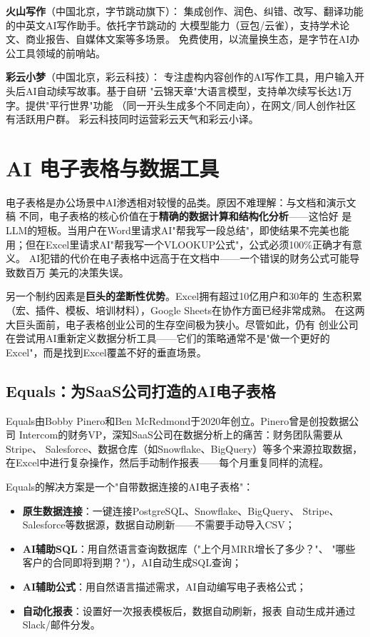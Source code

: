 \textbf{火山写作}（中国北京，字节跳动旗下）：
集成创作、润色、纠错、改写、翻译功能的中英文AI写作助手。依托字节跳动的
大模型能力（豆包/云雀），支持学术论文、商业报告、自媒体文案等多场景。
免费使用，以流量换生态，是字节在AI办公工具领域的前哨站。

\textbf{彩云小梦}（中国北京，彩云科技）：
专注虚构内容创作的AI写作工具，用户输入开头后AI自动续写故事。基于自研
"云锦天章"大语言模型，支持单次续写长达1万字。提供"平行世界"功能
（同一开头生成多个不同走向），在网文/同人创作社区有活跃用户群。
彩云科技同时运营彩云天气和彩云小译。



\section{AI 电子表格与数据工具}
\label{sec:cprod-spreadsheets}

电子表格是办公场景中AI渗透相对较慢的品类。原因不难理解：与文档和演示文稿
不同，电子表格的核心价值在于\textbf{精确的数据计算和结构化分析}——这恰好
是LLM的短板。当用户在Word里请求AI"帮我写一段总结"，即使结果不完美也能
用；但在Excel里请求AI"帮我写一个VLOOKUP公式"，公式必须100\%正确才有意义。
AI犯错的代价在电子表格中远高于在文档中——一个错误的财务公式可能导致数百万
美元的决策失误。

另一个制约因素是\textbf{巨头的垄断性优势}。Excel拥有超过10亿用户和30年的
生态积累（宏、插件、模板、培训材料），Google Sheets在协作方面已经非常成熟。
在这两大巨头面前，电子表格创业公司的生存空间极为狭小。尽管如此，仍有
创业公司在尝试用AI重新定义数据分析工具——它们的策略通常不是"做一个更好的
Excel"，而是找到Excel覆盖不好的垂直场景。

\subsection{Equals：为SaaS公司打造的AI电子表格}
\label{subsec:equals}

Equals由Bobby Pinero和Ben McRedmond于2020年创立。Pinero曾是创投数据公司
Intercom的财务VP，深知SaaS公司在数据分析上的痛苦：财务团队需要从Stripe、
Salesforce、数据仓库（如Snowflake、BigQuery）等多个来源拉取数据，
在Excel中进行复杂操作，然后手动制作报表——每个月重复同样的流程。

Equals的解决方案是一个"自带数据连接的AI电子表格"：

\begin{itemize}
  \item \textbf{原生数据连接}：一键连接PostgreSQL、Snowflake、BigQuery、
    Stripe、Salesforce等数据源，数据自动刷新——不需要手动导入CSV；
  \item \textbf{AI辅助SQL}：用自然语言查询数据库（"上个月MRR增长了多少？"、
    "哪些客户的合同即将到期？"），AI自动生成SQL查询；
  \item \textbf{AI辅助公式}：用自然语言描述需求，AI自动编写电子表格公式；
  \item \textbf{自动化报表}：设置好一次报表模板后，数据自动刷新，报表
    自动生成并通过Slack/邮件分发。
\end{itemize}

